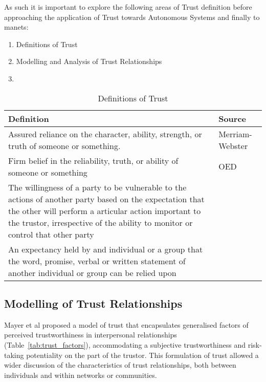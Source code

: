 As such it is important to explore the following areas of Trust definition before approaching the application of Trust towards Autonomous Systems and finally to \gls{manet}s:

\begin{enumerate}
  \item Definitions of Trust
  \item Modelling and Analysis of Trust Relationships
  \item 
\end{enumerate}


%
\begin{table}\centering
  \caption{Definitions of Trust}
  \label{tab:trust_definitions}
  \begin{tabularx}{\textwidth}{X p{3cm}}\toprule
    Definition & Source \\ \midrule
    Assured reliance on the character, ability, strength, or truth of someone or something.
    & Merriam-Webster\\
    Firm belief in the reliability, truth, or ability of someone or something & OED\\
    The willingness of a party to be vulnerable to the actions of another party based on the expectation that the other will perform a articular action important to the trustor, irrespective of the ability to monitor or control that other party & \cite{Mayer1995} \\
    An expectancy held by and individual or a group that the word, promise, verbal or written statement of another individual or group can be relied upon & \cite{Rotter1967}\\\bottomrule
  \end{tabularx}
\end{table}
%

\subsection{Modelling of Trust Relationships}
Mayer et al \cite{Mayer1995} proposed a model of trust that encapsulates generalised factors of perceived trustworthiness in interpersonal relationships (Table~\ref{tab:trust_factors}), accommodating a subjective trustworthiness and risk-taking potentiality on the part of the trustor.
This formulation of trust allowed a wider discussion of the characteristics of trust relationships, both between individuals and within networks or communities.

